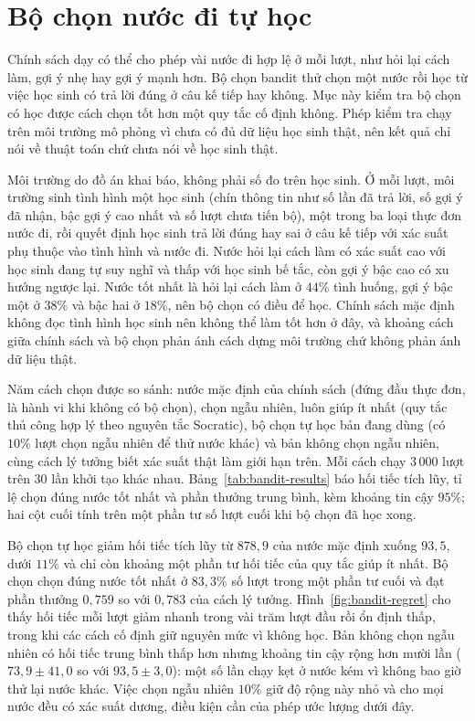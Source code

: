 \section{Bộ chọn nước đi tự học}\label{sec:eval-bandit}

Chính sách dạy có thể cho phép vài nước đi hợp lệ ở mỗi lượt, như hỏi lại cách làm, gợi ý nhẹ hay gợi ý mạnh hơn. Bộ chọn bandit thử chọn một nước rồi học từ việc học sinh có trả lời đúng ở câu kế tiếp hay không. Mục này kiểm tra bộ chọn có học được cách chọn tốt hơn một quy tắc cố định không. Phép kiểm tra chạy trên môi trường mô phỏng vì chưa có đủ dữ liệu học sinh thật, nên kết quả chỉ nói về thuật toán chứ chưa nói về học sinh thật.

Môi trường do đồ án khai báo, không phải số đo trên học sinh. Ở mỗi lượt, môi trường sinh tình hình một học sinh (chín thông tin như số lần đã trả lời, số gợi ý đã nhận, bậc gợi ý cao nhất và số lượt chưa tiến bộ), một trong ba loại thực đơn nước đi, rồi quyết định học sinh trả lời đúng hay sai ở câu kế tiếp với xác suất phụ thuộc vào tình hình và nước đi. Nước hỏi lại cách làm có xác suất cao với học sinh đang tự suy nghĩ và thấp với học sinh bế tắc, còn gợi ý bậc cao có xu hướng ngược lại. Nước tốt nhất là hỏi lại cách làm ở $44\%$ tình huống, gợi ý bậc một ở $38\%$ và bậc hai ở $18\%$, nên bộ chọn có điều để học. Chính sách mặc định không đọc tình hình học sinh nên không thể làm tốt hơn ở đây, và khoảng cách giữa chính sách và bộ chọn phản ánh cách dựng môi trường chứ không phản ánh dữ liệu thật.

Năm cách chọn được so sánh: nước mặc định của chính sách (đứng đầu thực đơn, là hành vi khi không có bộ chọn), chọn ngẫu nhiên, luôn giúp ít nhất (quy tắc thủ công hợp lý theo nguyên tắc Socratic), bộ chọn tự học bản đang dùng (có $10\%$ lượt chọn ngẫu nhiên để thử nước khác) và bản không chọn ngẫu nhiên, cùng cách lý tưởng biết xác suất thật làm giới hạn trên. Mỗi cách chạy $3\,000$ lượt trên $30$ lần khởi tạo khác nhau. Bảng~\ref{tab:bandit-results} báo hối tiếc tích lũy, tỉ lệ chọn đúng nước tốt nhất và phần thưởng trung bình, kèm khoảng tin cậy $95\%$; hai cột cuối tính trên một phần tư số lượt cuối khi bộ chọn đã học xong.



Bộ chọn tự học giảm hối tiếc tích lũy từ $878{,}9$ của nước mặc định xuống $93{,}5$, dưới $11\%$ và chỉ còn khoảng một phần tư hối tiếc của quy tắc giúp ít nhất. Bộ chọn chọn đúng nước tốt nhất ở $83{,}3\%$ số lượt trong một phần tư cuối và đạt phần thưởng $0{,}759$ so với $0{,}783$ của cách lý tưởng. Hình~\ref{fig:bandit-regret} cho thấy hối tiếc mỗi lượt giảm nhanh trong vài trăm lượt đầu rồi ổn định thấp, trong khi các cách cố định giữ nguyên mức vì không học. Bản không chọn ngẫu nhiên có hối tiếc trung bình thấp hơn nhưng khoảng tin cậy rộng hơn mười lần ($73{,}9\pm41{,}0$ so với $93{,}5\pm3{,}0$): một số lần chạy kẹt ở nước kém vì không bao giờ thử lại nước khác. Việc chọn ngẫu nhiên $10\%$ giữ độ rộng này nhỏ và cho mọi nước đều có xác suất dương, điều kiện cần của phép ước lượng dưới đây.

